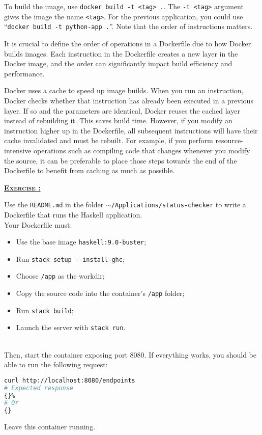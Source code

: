 \documentclass[french]{article}
\newcounter{execounter}
\newenvironment{exercice}
{%
    \refstepcounter{execounter}
    \small
    \begin{tcolorbox}[boxrule=0.5pt, colback=white, colframe=black, arc=3mm]
    \par
    \noindent
    \underline{\textsc{\textbf{Exercise \theexecounter:}}}
}
{%
    \end{tcolorbox}
}
\begin{document}
To build the image, use \texttt{docker build -t <tag> .}.
The \texttt{-t <tag>} argument gives the image the name \texttt{<tag>}.
For the previous application, you could use “\texttt{docker build -t python-app .}”.
Note that the order of instructions matters.

It is crucial to define the order of operations in a Dockerfile due to how Docker builds images.
Each instruction in the Dockerfile creates a new layer in the Docker image, and the order can significantly impact build efficiency and performance.

Docker uses a cache to speed up image builds.
When you run an instruction, Docker checks whether that instruction has already been executed in a previous layer.
If so and the parameters are identical, Docker reuses the cached layer instead of rebuilding it.
This saves build time.
However, if you modify an instruction higher up in the Dockerfile, all subsequent instructions will have their cache invalidated and must be rebuilt.
For example, if you perform resource-intensive operations such as compiling code that changes whenever you modify the source, it can be preferable to place those steps towards the end of the Dockerfile to benefit from caching as much as possible.

\begin{exercice}
    Use the \texttt{README.md} in the folder \texttt{$\sim$/Applications/status-checker} to write a Dockerfile that runs the Haskell application.\\

    Your Dockerfile must:
    \begin{itemize}
        \item Use the base image \texttt{haskell:9.0-buster};
        \item Run \texttt{stack setup -{}-install-ghc};
        \item Choose \texttt{/app} as the workdir;
        \item Copy the source code into the container’s \texttt{/app} folder;
        \item Run \texttt{stack build};
        \item Launch the server with \texttt{stack run}.
    \end{itemize}\\

    Then, start the container exposing port 8080.
    If everything works, you should be able to run the following request:

    \begin{lstlisting}[language=bash]
curl http://localhost:8080/endpoints
# Expected response
{}%
# Or
{}
    \end{lstlisting}
    
    Leave this container running.
\end{exercice}
\end{document}
